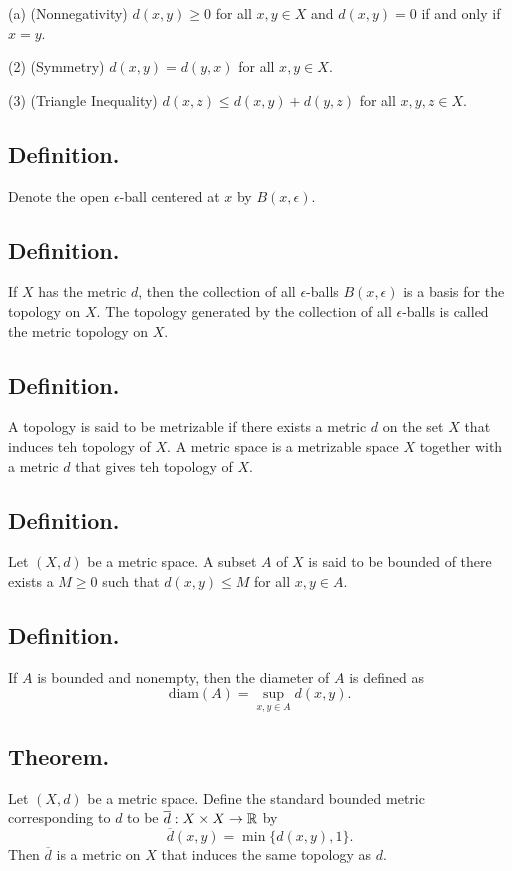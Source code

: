 \documentclass[titlepage]{article}
\begin{document}
(a) (Nonnegativity) $d(x, y) \geq 0$ for all $x, y \in X$ and $d(x, y) = 0$ if and only if $x = y$.

(2) (Symmetry) $d(x, y) = d(y, x)$ for all $x, y \in X$.

(3) (Triangle Inequality) $d(x, z) \leq d(x, y) + d(y, z)$ for all $x, y, z \in X$.

\subsection{Definition.} Denote the open $\epsilon$-ball centered at $x$ by $B(x, \epsilon)$.

\subsection{Definition.} If $X$ has the metric $d$, then the collection of all $\epsilon$-balls $B(x, \epsilon)$ is a basis for the topology on $X$. The topology generated by the collection of all $\epsilon$-balls is called the metric topology on $X$.

\subsection{Definition.} A topology is said to be metrizable if there exists a metric $d$ on the set $X$ that induces teh topology of $X$. A metric space is a metrizable space $X$ together with a metric $d$ that gives teh topology of $X$.

\subsection{Definition.} Let $(X, d)$ be a metric space. A subset $A$ of $X$ is said to be bounded of there exists a $M \geq 0$ such that $d(x, y) \leq M$ for all $x, y \in A$.

\subsection{Definition.} If $A$ is bounded and nonempty, then the diameter of $A$ is defined as 
$$\text{diam}(A) = \sup_{x, y \in A} d(x, y).$$

\subsection{Theorem.} Let $(X, d)$ be a metric space. Define the standard bounded metric corresponding to $d$ to be $\overline{d}: X \times X \to \mathbb{R}$ by 
$$\overline{d}(x, y) = \min \{d(x, y), 1\}.$$
Then $\overline{d}$ is a metric on $X$ that induces the same topology as $d$.
\end{document}
